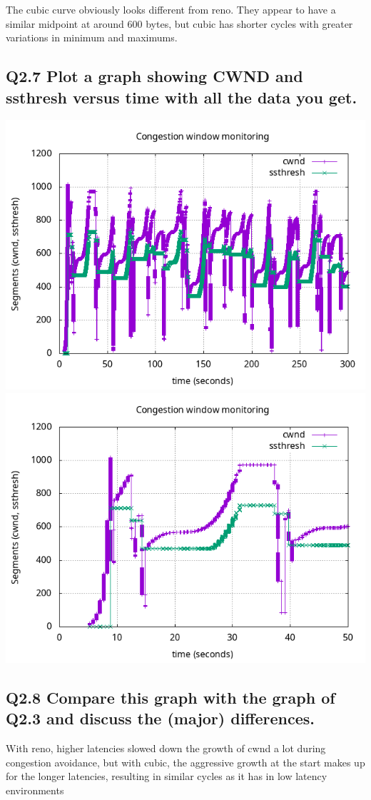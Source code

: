 \documentclass{article}
\begin{document}
The cubic curve obviously looks different from reno. They appear to have a similar midpoint at around 600 bytes, but cubic has shorter cycles with greater variations in minimum and maximums. 

\subsection{Q2.7 Plot a graph showing CWND and ssthresh versus time with all the data you get.}

\includegraphics[scale=0.5]{plots/lab1-group5-task2-question2.7.png}
\includegraphics[scale=0.5]{plots/lab1-group5-task2-question2.7-xrange-0-50.png}

\subsection{Q2.8 Compare this graph with the graph of Q2.3 and discuss the (major) differences.}

With reno, higher latencies slowed down the growth of cwnd a lot during congestion avoidance, but with cubic, the aggressive growth at the start makes up for the longer latencies, resulting in similar cycles as it has in low latency environments
\end{document}
